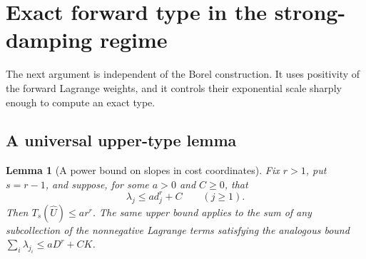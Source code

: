 \documentclass[11pt,a4paper]{article}
\numberwithin{equation}{section}
\newtheorem{lemma}[theorem]{Lemma}
\theoremstyle{definition}
\theoremstyle{remark}
\theoremstyle{definition}
\newcommand{\U}{\widehat U}
\begin{document}
\section{Exact forward type in the strong-damping regime}
\label{sec:type}

The next argument is independent of the Borel construction. It uses
positivity of the forward Lagrange weights, and it controls their
exponential scale sharply enough to compute an exact type.

\subsection{A universal upper-type lemma}
\begin{lemma}[A power bound on slopes in cost coordinates]
\label{lem:type-upper}
Fix $r>1$, put $s=r-1$, and suppose, for some $a>0$ and $C\ge0$, that
\begin{equation}
 \lambda_j\le a d_j^r+C\qquad(j\ge1).
 \label{eq:cost-power-bound}
\end{equation}
Then $T_s(\U)\le ar^r$. The same upper bound applies to the sum of any
subcollection of the nonnegative Lagrange terms satisfying the analogous
bound $\sum_i\lambda_{j_i}\le aD^r+CK$.
\end{lemma}
\end{document}
